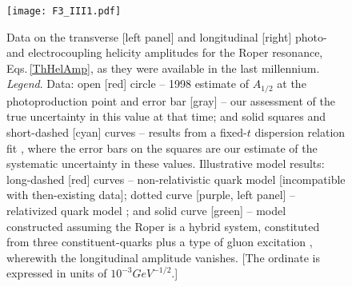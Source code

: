 \begin{figure}[t]
\centerline{\texttt{[image: F3\_III1.pdf]}}
\caption{\label{OldElectrocouplings}
Data on the transverse [left panel] and longitudinal [right] photo- and electrocoupling helicity amplitudes for the Roper resonance, Eqs.\,\eqref{ThHelAmp}, as they were available in the last millennium.
%
%
\emph{Legend}.
Data:
open [red] circle -- 1998 estimate of $A_{1/2}$ at the photoproduction point \cite{Caso:1998} and %
error bar [gray] -- our assessment of the true uncertainty in this value at that time;
and solid squares and short-dashed [cyan] curves -- results from a fixed-$t$ dispersion relation fit \cite{Gerhardt:1980yg}, where the error bars on the squares are our estimate of the systematic uncertainty in these values.
%
Illustrative model results:
long-dashed [red] curves -- non-relativistic quark model \cite{Koniuk:1979vy, Close:1989aj} [incompatible with then-existing data];
dotted curve [purple, left panel] -- relativized quark model \cite{Warns:1989ie};
and solid curve [green] -- model constructed assuming the Roper is a hybrid system, constituted from three constituent-quarks plus a type of gluon excitation \cite{Li:1991yba}, wherewith the longitudinal amplitude vanishes.
%
[The ordinate is expressed in units of $10^{-3}GeV^{-1/2}$.]}
\end{figure}

